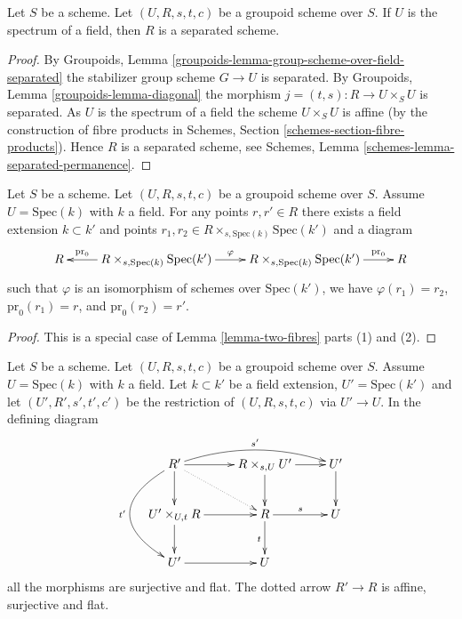 \begin{lemma}
\label{lemma-groupoid-on-field-separated}
Let $S$ be a scheme. Let $(U, R, s, t, c)$ be a groupoid scheme
over $S$. If $U$ is the spectrum of a field,
then $R$ is a separated scheme.
\end{lemma}

\begin{proof}
By
Groupoids, Lemma \ref{groupoids-lemma-group-scheme-over-field-separated}
the stabilizer group scheme $G \to U$ is separated. By
Groupoids, Lemma \ref{groupoids-lemma-diagonal}
the morphism $j = (t, s) : R \to U \times_S U$ is separated.
As $U$ is the spectrum of a field the scheme
$U \times_S U$ is affine (by the construction of fibre products in
Schemes, Section \ref{schemes-section-fibre-products}).
Hence $R$ is a separated scheme, see
Schemes, Lemma \ref{schemes-lemma-separated-permanence}.
\end{proof}

\begin{lemma}
\label{lemma-groupoid-on-field-homogeneous}
Let $S$ be a scheme. Let $(U, R, s, t, c)$ be a groupoid scheme
over $S$. Assume $U = \text{Spec}(k)$ with $k$ a field.
For any points $r, r' \in R$ there exists a field extension
$k \subset k'$ and points
$r_1, r_2 \in R \times_{s, \text{Spec}(k)} \text{Spec}(k')$
and a diagram
$$
\xymatrix{
R &
R \times_{s, \text{Spec}(k)} \text{Spec}(k')
\ar[l]_-{\text{pr}_0} \ar[r]^\varphi &
R \times_{s, \text{Spec}(k)} \text{Spec}(k')
\ar[r]^-{\text{pr}_0} &
R
}
$$
such that $\varphi$ is an isomorphism of schemes over $\text{Spec}(k')$,
we have $\varphi(r_1) = r_2$, $\text{pr}_0(r_1) = r$, and
$\text{pr}_0(r_2) = r'$.
\end{lemma}

\begin{proof}
This is a special case of
Lemma \ref{lemma-two-fibres}
parts (1) and (2).
\end{proof}

\begin{lemma}
\label{lemma-restrict-groupoid-on-field}
Let $S$ be a scheme. Let $(U, R, s, t, c)$ be a groupoid scheme
over $S$. Assume $U = \text{Spec}(k)$ with $k$ a field.
Let $k \subset k'$ be a field extension, $U' = \text{Spec}(k')$
and let $(U', R', s', t', c')$ be the restriction of
$(U, R, s, t, c)$ via $U' \to U$. In the defining diagram
$$
\xymatrix{
R' \ar[d] \ar[r] \ar@/_3pc/[dd]_{t'} \ar@/^1pc/[rr]^{s'} \ar@{..>}[rd] &
R \times_{s, U} U' \ar[r] \ar[d] &
U' \ar[d] \\
U' \times_{U, t} R \ar[d] \ar[r] &
R \ar[r]^s \ar[d]_t &
U \\
U' \ar[r] &
U
}
$$
all the morphisms are surjective and flat. The dotted arrow $R' \to R$ is
affine, surjective and flat.
\end{lemma}

